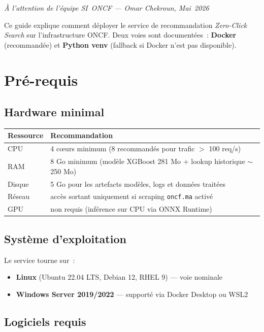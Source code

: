 \documentclass[12pt, a4paper]{report}
\begin{document}
{\large\itshape À l'attention de l'équipe SI~ONCF --- Omar Chekroun, Mai~2026}

\bigskip

Ce guide explique comment déployer le service de recommandation
\textit{Zero-Click Search} sur l'infrastructure ONCF. Deux voies sont
documentées~: \textbf{Docker} (recommandée) et \textbf{Python venv}
(fallback si Docker n'est pas disponible).

\section{Pré-requis}

\subsection{Hardware minimal}

\begin{tabularx}{\linewidth}{@{}lX@{}}
\toprule
\textbf{Ressource} & \textbf{Recommandation} \\
\midrule
CPU & 4 cœurs minimum (8 recommandés pour trafic $>$ 100 req/s) \\
RAM & 8 Go minimum (modèle XGBoost 281 Mo + lookup historique $\sim$250 Mo) \\
Disque & 5 Go pour les artefacts modèles, logs et données traitées \\
Réseau & accès sortant uniquement si scraping \texttt{oncf.ma} activé \\
GPU & non requis (inférence sur CPU via ONNX Runtime) \\
\bottomrule
\end{tabularx}

\subsection{Système d'exploitation}

Le service tourne sur~:
\begin{itemize}
\item \textbf{Linux} (Ubuntu 22.04 LTS, Debian 12, RHEL 9) --- voie nominale
\item \textbf{Windows Server 2019/2022} --- supporté via Docker Desktop ou WSL2
\end{itemize}

\subsection{Logiciels requis}
\end{document}
